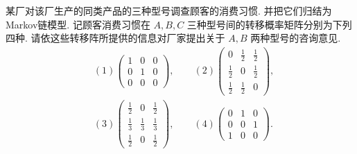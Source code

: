 \begin{problem}{3.14}
某厂对该厂生产的同类产品的三种型号调查顾客的消费习惯. 并把它们归结为Markov链模型. 记顾客消费习惯在 $A, B, C $ 三种型号间的转移概率矩阵分别为下列四种. 请依这些转移阵所提供的信息对厂家提出关于 $A, B$ 两种型号的咨询意见.
\[
	\begin{split}
		&(1)\begin{pmatrix}
			1 & 0 & 0 \\
			0 & 1 & 0 \\
			0 & 0 & 0
		\end{pmatrix},\qquad
		(2)\begin{pmatrix}
			0           & \frac{1}{2} & \frac{1}{2} \\
			\frac{1}{2} & 0           & \frac{1}{2} \\
			\frac{1}{2} & \frac{1}{2} & 0
		\end{pmatrix},\\[0.5cm]
		&(3)\begin{pmatrix}
			\frac{1}{2} & 0           & \frac{1}{2} \\
			\frac{1}{3} & \frac{1}{3} & \frac{1}{3} \\
			\frac{1}{2} & 0           & \frac{1}{2}
		\end{pmatrix},\qquad
		(4)\begin{pmatrix}
			0 & 1 & 0 \\
			0 & 0 & 1 \\
			1 & 0 & 0
		\end{pmatrix}.
	\end{split}
\]
\end{problem}
